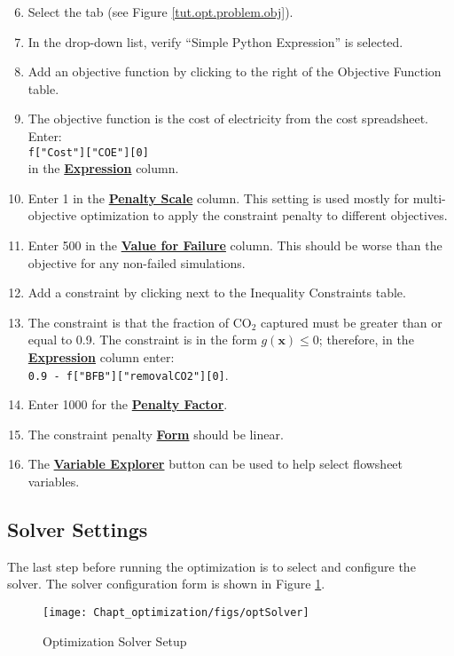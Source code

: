 \begin{enumerate}
	\setcounter{enumi}{5}
	\item Select the  tab (see Figure \ref{tut.opt.problem.obj}).
	\item In the drop-down list, verify ``Simple Python Expression'' is selected.
	\item Add an objective function by clicking \bu{+} to the right of the Objective Function table.
	\item The objective function is the cost of electricity from the cost spreadsheet.  Enter:\\
	   \verb|f["Cost"]["COE"][0]|\\
	    in the \textbf{\underline{Expression}} column.
	\item Enter 1 in the \textbf{\underline{Penalty Scale}} column. This setting is used mostly for multi-objective optimization to apply the constraint penalty to different objectives.
	\item Enter 500 in the \textbf{\underline{Value for Failure}} column. This should be worse than the objective for any non-failed simulations.
	\item Add a constraint by clicking \bu{+} next to the Inequality Constraints table.
	\item The constraint is that the fraction of CO$_2$ captured must be greater than or equal to 0.9. The constraint is in the form $g(\mathbf{x}) \leq 0$; therefore, in the \textbf{\underline{Expression}} column enter: \\
	 \verb|0.9 - f["BFB"]["removalCO2"][0]|.
	\item Enter 1000 for the \textbf{\underline{Penalty Factor}}.
	\item The constraint penalty \textbf{\underline{Form}} should be linear.
	\item The \textbf{\underline{Variable Explorer}} button can be used to help select flowsheet variables.
\end{enumerate}


\subsection{Solver Settings}
The last step before running the optimization is to select and configure the solver. The solver configuration form is shown in Figure \ref{tut.opt.solver}.

\begin{figure}[H] 
	\begin{center}
		\texttt{[image: Chapt\_optimization/figs/optSolver]}
		\caption{Optimization Solver Setup}
		\label{tut.opt.solver}
	\end{center}
\end{figure}

